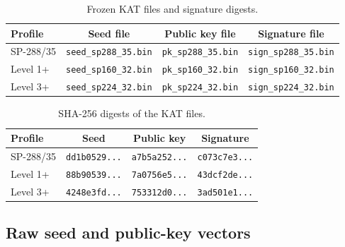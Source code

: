 \documentclass[11pt,a4paper]{article}
\begin{document}
\begin{table}[ht]
\centering
\small
\caption{Frozen KAT files and signature digests.}
\label{tab:katfiles}
\begin{tabular}{@{}lccc@{}}
\toprule
Profile & Seed file & Public key file & Signature file \\
\midrule
SP-288/35 & \texttt{seed\_sp288\_35.bin} & \texttt{pk\_sp288\_35.bin} & \texttt{sign\_sp288\_35.bin} \\
Level 1+ & \texttt{seed\_sp160\_32.bin} & \texttt{pk\_sp160\_32.bin} & \texttt{sign\_sp160\_32.bin} \\
Level 3+ & \texttt{seed\_sp224\_32.bin} & \texttt{pk\_sp224\_32.bin} & \texttt{sign\_sp224\_32.bin} \\
\bottomrule
\end{tabular}
\end{table}

\begin{table}[ht]
\centering
\small
\caption{SHA-256 digests of the KAT files.}
\label{tab:kathashes}
\begin{tabular}{@{}lccc@{}}
\toprule
Profile & Seed & Public key & Signature \\
\midrule
SP-288/35 & \texttt{dd1b0529...} & \texttt{a7b5a252...} & \texttt{c073c7e3...} \\
Level 1+ & \texttt{88b90539...} & \texttt{7a0756e5...} & \texttt{43dcf2de...} \\
Level 3+ & \texttt{4248e3fd...} & \texttt{753312d0...} & \texttt{3ad501e1...} \\
\bottomrule
\end{tabular}
\end{table}

\subsection{Raw seed and public-key vectors}
\end{document}
